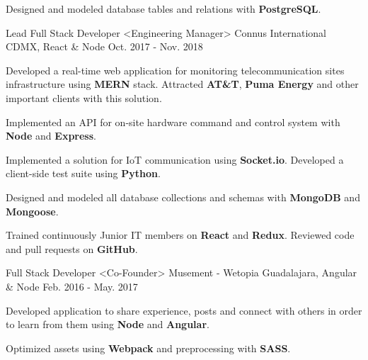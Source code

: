 \begin{cventries}
{\begin{cvitems}
        \item {Designed and modeled database tables and relations with \textbf{PostgreSQL}.}
      \end{cvitems}
    }
  \cventry
    {Lead Full Stack Developer <Engineering Manager>}
    {Connus International}
    {CDMX, React \& Node}
    {Oct. 2017 - Nov. 2018}
    {
      \begin{cvitems}
        \item {Developed a real-time web application for monitoring telecommunication sites infrastructure using \textbf{MERN} stack. Attracted \textbf{AT\&T}, \textbf{Puma Energy} and other important clients with this solution.}
        \item {Implemented an API for on-site hardware command and control system with \textbf{Node} and \textbf{Express}.}
        \item {Implemented a solution for IoT communication using \textbf{Socket.io}. Developed a client-side test suite using \textbf{Python}.}
        \item {Designed and modeled all database collections and schemas with \textbf{MongoDB} and \textbf{Mongoose}.}
        \item {Trained continuously Junior IT members on \textbf{React} and \textbf{Redux}. Reviewed code and pull requests on \textbf{GitHub}.}
      \end{cvitems}
    }
    \cventry
      {Full Stack Developer <Co-Founder>}
      {Musement - Wetopia}
      {Guadalajara, Angular \& Node}
      {Feb. 2016 - May. 2017}
      {
        \begin{cvitems}
          \item {Developed application to share experience, posts and connect with others in order to learn from them using \textbf{Node} and \textbf{Angular}.}
          \item {Optimized assets using \textbf{Webpack} and preprocessing with \textbf{SASS}.}
        \end{cvitems}
      }
  \end{cventries}
